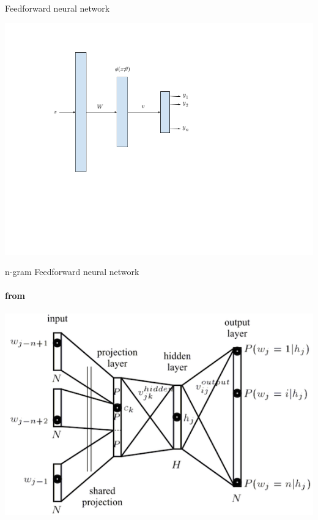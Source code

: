 \begin{frame}{Feedforward neural network}
\begin{block}{}
\centering
\includegraphics[scale=0.4]{figures/ff/ffnet.png}
\end{block}
\end{frame}

\begin{frame}{n-gram Feedforward neural network}
\framesubtitle{from \cite{Bengio2003}}
\begin{block}{}
\centering
\includegraphics[scale=0.4]{figures/ff/ngramfflm.png}
\end{block}
\end{frame}

